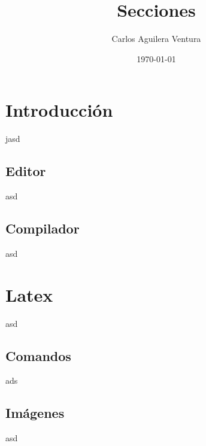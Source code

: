 \documentclass[a4paper]{book}
\title{Secciones}
\author{Carlos Aguilera Ventura}
\date{\today}
\begin{document}
\maketitle
\tableofcontents 

\chapter{Introducción}
jasd

\section*{Editor}
asd
\section{Compilador}
asd
\chapter{Latex}
asd
\section{Comandos}
ads
\section{Imágenes}
asd
\end{document}
